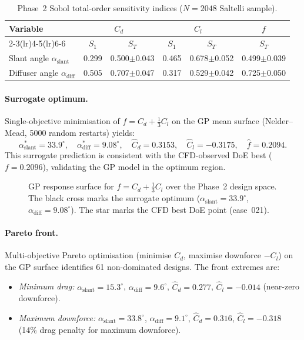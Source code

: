 \begin{table}[h]
  \centering
  \caption{Phase~2 Sobol total-order sensitivity indices ($N=2048$ Saltelli sample).}
  \label{tab:sobol_phase2}
  \begin{tabular}{lccccc}
    \toprule
    Variable & \multicolumn{2}{c}{$C_d$} & \multicolumn{2}{c}{$C_l$} & \multicolumn{1}{c}{$f$} \\
    \cmidrule(lr){2-3}\cmidrule(lr){4-5}\cmidrule(lr){6-6}
     & $S_1$ & $S_T$ & $S_1$ & $S_T$ & $S_T$ \\
    \midrule
    Slant angle $\alpha_\mathrm{slant}$   & 0.299 & 0.500$\pm$0.043 & 0.465 & 0.678$\pm$0.052 & 0.499$\pm$0.039 \\
    Diffuser angle $\alpha_\mathrm{diff}$ & 0.505 & 0.707$\pm$0.047 & 0.317 & 0.529$\pm$0.042 & 0.725$\pm$0.050 \\
    \bottomrule
  \end{tabular}
\end{table}

\paragraph{Surrogate optimum.} Single-objective minimisation of $f = C_d + \tfrac{1}{3}C_l$ on the GP mean surface (Nelder--Mead, 5000 random restarts) yields:
\[
  \alpha_\mathrm{slant}^* = 33.9^\circ,\quad
  \alpha_\mathrm{diff}^*  = 9.08^\circ,\quad
  \hat{C}_d = 0.3153,\quad \hat{C}_l = -0.3175,\quad \hat{f} = 0.2094.
\]
This surrogate prediction is consistent with the CFD-observed DoE best ($f=0.2096$), validating the GP model in the optimum region.

\begin{figure}[h]
  \centering
  \caption{GP response surface for $f = C_d + \tfrac{1}{3}C_l$ over the Phase~2 design space. The black cross marks the surrogate optimum ($\alpha_\mathrm{slant}=33.9^\circ$, $\alpha_\mathrm{diff}=9.08^\circ$). The star marks the CFD best DoE point (case~021).}
  \label{fig:response_surface}
\end{figure}

\paragraph{Pareto front.} Multi-objective Pareto optimisation (minimise $C_d$, maximise downforce $-C_l$) on the GP surface identifies 61 non-dominated designs. The front extremes are:
\begin{itemize}
  \item \emph{Minimum drag:} $\alpha_\mathrm{slant}=15.3^\circ$, $\alpha_\mathrm{diff}=9.6^\circ$, $\hat{C}_d=0.277$, $\hat{C}_l=-0.014$ (near-zero downforce).
  \item \emph{Maximum downforce:} $\alpha_\mathrm{slant}=33.8^\circ$, $\alpha_\mathrm{diff}=9.1^\circ$, $\hat{C}_d=0.316$, $\hat{C}_l=-0.318$ (14\% drag penalty for maximum downforce).
\end{itemize}

